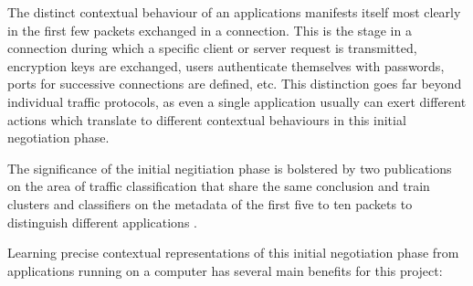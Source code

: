 \documentclass[a4paper,12pt,twoside]{article}
\begin{document}
The distinct contextual behaviour of an applications manifests itself most clearly in the first few packets exchanged in a connection. This is the stage in a connection during which a specific client or server request is transmitted, encryption keys are exchanged, users authenticate themselves with passwords, ports for successive connections are defined, etc. This distinction goes far beyond individual traffic protocols, as even a single application usually can exert different actions which translate to different contextual behaviours in this initial negotiation phase. 

The significance of the initial negitiation phase is bolstered by two publications on the area of traffic classification that share the same conclusion and train clusters and classifiers on the metadata of the first five to ten packets to distinguish different applications \cite{bernaille2006traffic,crotti2007traffic}.

Learning precise contextual representations of this initial negotiation phase from applications running on a computer has several main benefits for this project: 
\end{document}
